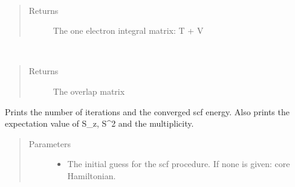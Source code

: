 \documentclass[letterpaper,10pt,english]{sphinxmanual}
\begin{document}
\begin{fulllineitems}
\begin{fulllineitems}
\end{fulllineitems}


\begin{fulllineitems}
\label{\detokenize{UHF:hf.HartreeFock.UHF.MF.get_one_e}}~\begin{quote}\begin{description}
\item[{Returns}] \leavevmode
The one electron integral matrix: T + V

\end{description}\end{quote}

\end{fulllineitems}


\begin{fulllineitems}
\label{\detokenize{UHF:hf.HartreeFock.UHF.MF.get_ovlp}}~\begin{quote}\begin{description}
\item[{Returns}] \leavevmode
The overlap matrix

\end{description}\end{quote}

\end{fulllineitems}


\begin{fulllineitems}
\label{\detokenize{UHF:hf.HartreeFock.UHF.MF.get_scf_solution}}
Prints the number of iterations and the converged scf energy.
Also prints the expectation value of S\_z, S\textasciicircum{}2 and the multiplicity.
\begin{quote}\begin{description}
\item[{Parameters}] \leavevmode\begin{itemize}
\item {} 
 \textendash{} The initial guess for the scf procedure. If none is given: core Hamiltonian.


\end{itemize}
\end{description}
\end{quote}
\end{fulllineitems}
\end{fulllineitems}
\end{document}
